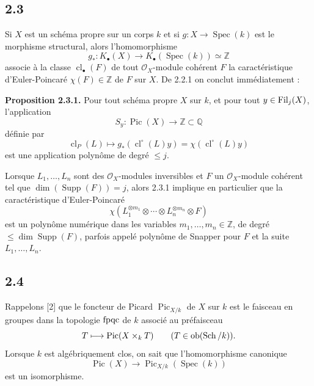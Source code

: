 \documentclass[11pt]{article}
\newcommand{\cl}{\operatorname{cl}}
\newcommand{\Spec}{\operatorname{Spec}}
\providecommand{\Pic}{\operatorname{Pic}}
\providecommand{\Supp}{\operatorname{Supp}}
\begin{document}
\subsection*{2.3}
Si $X$ est un schéma propre sur un corps $k$ et si $g:X\to\Spec(k)$ est le morphisme structural, alors l'homomorphisme
\[
g_*:K_\bullet(X)\longrightarrow K_\bullet(\Spec(k))\simeq\mathbb Z
\]
associe à la classe $\cl_\bullet(F)$ de tout $\mathcal O_X$-module cohérent $F$ la caractéristique d'Euler-Poincaré $\chi(F)\in\mathbb Z$ de $F$ sur $X$. De 2.2.1 on conclut immédiatement :

\textbf{Proposition 2.3.1.} Pour tout schéma propre $X$ sur $k$, et pour tout $y\in\Filt_j(X)$, l'application
\[
S_y:\Pic(X)\longrightarrow\mathbb Z\subset\mathbb Q
\]
définie par
\[
\cl_P(L)\longmapsto g_*(\cl^\circ(L)y)=\chi(\cl^\circ(L)y)
\]
est une application polynôme de degré $\leq j$.

Lorsque $L_1,\ldots,L_n$ sont des $\mathcal O_X$-modules inversibles et $F$ un $\mathcal O_X$-module cohérent tel que $\dim(\Supp(F))=j$, alors 2.3.1 implique en particulier que la caractéristique d'Euler-Poincaré
\begin{equation}\tag{2.3.2}
\chi(L_1^{\otimes m_1}\otimes\cdots\otimes L_n^{\otimes m_n}\otimes F)
\end{equation}
est un polynôme numérique dans les variables $m_1,\ldots,m_n\in\mathbb Z$, de degré $\leq\dim\Supp(F)$, parfois appelé polynôme de Snapper pour $F$ et la suite $L_1,\ldots,L_n$.

\subsection*{2.4}
Rappelons [2] que le foncteur de Picard $\Pic_{X/k}$ de $X$ sur $k$ est le faisceau en groupes dans la topologie $\fpqc$ de $k$ associé au préfaisceau
\[
T\longmapsto \Pic(X\times_kT)\qquad (T\in\Ob(\Sch/k)).
\]
Lorsque $k$ est algébriquement clos, on sait que l'homomorphisme canonique
\[
\Pic(X)\longrightarrow\Pic_{X/k}(\Spec(k))
\]
est un isomorphisme.



\providecommand{\Filt}{\operatorname{Fil}}
\providecommand{\fpqc}{\mathrm{fpqc}}
\providecommand{\Sch}{\operatorname{Sch}}
\providecommand{\Ob}{\operatorname{ob}}
\providecommand{\Gm}{\mathbb G_m}
\providecommand{\Der}{\operatorname{Der}}
\providecommand{\SL}{\operatorname{SL}}
\providecommand{\Aut}{\operatorname{Aut}}
\providecommand{\Mod}{\operatorname{Mod}}
\providecommand{\Tors}{\operatorname{Tors}}
\providecommand{\Mat}{\operatorname{Mat}}
\providecommand{\len}{\operatorname{length}}
\providecommand{\red}{\mathrm{red}}
\providecommand{\id}{\operatorname{id}}
\providecommand{\Spec}{\operatorname{Spec}}
\providecommand{\Picf}{\operatorname{Pic}}
\providecommand{\Ens}{\operatorname{Ens}}
\providecommand{\clp}{\operatorname{cl}_{P}}
\providecommand{\clo}{\operatorname{cl}^{\circ}}
\providecommand{\clb}{\operatorname{cl}_{\bullet}}
\providecommand{\Grb}{\operatorname{Gr}_{\bullet}}
\providecommand{\Gro}{\operatorname{Gr}^{\circ}}
\providecommand{\longO}[1]{\operatorname{length}_{#1}}
\end{document}
